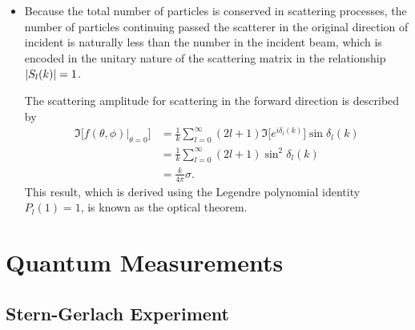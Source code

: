 \documentclass[11pt, a4paper]{article}
\begin{document}
\begin{itemize}
    \item Because the total number of particles is conserved in scattering processes, the number of particles continuing passed the scatterer in the original direction of incident is naturally less than the number in the incident beam, which is encoded in the unitary nature of the scattering matrix in the relationship $ \abs{S_{l}(k)} = 1 $. 

    The scattering amplitude for scattering in the forward direction is described by
    \begin{align*}
        \Im \big[ f(\theta, \phi)\big |_{\theta = 0} \big] &= \frac{1}{k} \sum_{l = 0}^{\infty} (2l + 1) \Im \big[ e^{i\delta_{l}(k)} \big] \sin \delta_{l}(k) \\
        & = \frac{1}{k} \sum_{l = 0}^{\infty} (2l + 1) \sin^{2} \delta_{l}(k)\\
        &= \frac{k}{4\pi} \sigma.
    \end{align*}
    This result, which is derived using the Legendre polynomial identity $ P_{l}(1) = 1 $, is known as the optical theorem. 
    
    
\end{itemize}

\section{Quantum Measurements}
\subsection{Stern-Gerlach Experiment}
\end{document}
